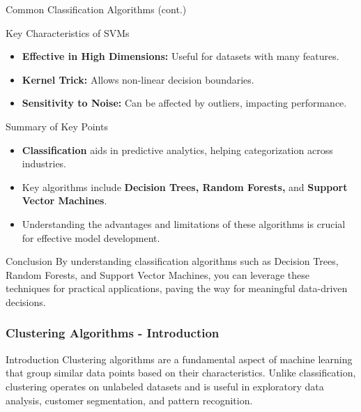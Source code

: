 \documentclass[aspectratio=169]{beamer}
\begin{document}
\begin{frame}[fragile]{Common Classification Algorithms (cont.)}
    \begin{block}{Key Characteristics of SVMs}
        \begin{itemize}
            \item \textbf{Effective in High Dimensions:} Useful for datasets with many features.
            \item \textbf{Kernel Trick:} Allows non-linear decision boundaries.
            \item \textbf{Sensitivity to Noise:} Can be affected by outliers, impacting performance.
        \end{itemize}
    \end{block}
\end{frame}

\begin{frame}[fragile]{Summary of Key Points}
    \begin{itemize}
        \item \textbf{Classification} aids in predictive analytics, helping categorization across industries.
        \item Key algorithms include \textbf{Decision Trees, Random Forests,} and \textbf{Support Vector Machines}.
        \item Understanding the advantages and limitations of these algorithms is crucial for effective model development.
    \end{itemize}
\end{frame}

\begin{frame}[fragile]{Conclusion}
    By understanding classification algorithms such as Decision Trees, Random Forests, and Support Vector Machines, you can leverage these techniques for practical applications, paving the way for meaningful data-driven decisions.
\end{frame}

\begin{frame}[fragile]
    \frametitle{Clustering Algorithms - Introduction}
    \begin{block}{Introduction}
        Clustering algorithms are a fundamental aspect of machine learning that group similar data points based on their characteristics. Unlike classification, clustering operates on unlabeled datasets and is useful in exploratory data analysis, customer segmentation, and pattern recognition.
    \end{block}
\end{frame}
\end{document}
